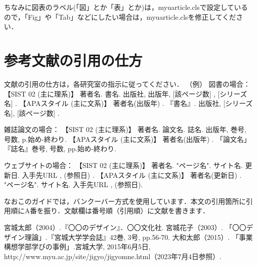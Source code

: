 \documentclass[paper=a4paper,jafontsize=9pt,twocolumn,number_oflines=45,line_length=28zw]{myuarticle}
\begin{document}
ちなみに図表のラベル(「図」とか「表」とか)は，myuarticle.clsで設定しているので，「Fig」や「Tab」などにしたい場合は，myuarticle.clsを修正してください．

\section{参考文献の引用の仕方}
文献の引用の仕方は，各研究室の指示に従ってください．
（例）
図書の場合：
【SIST 02 (主に理系)】
著者名. 書名. 出版社, 出版年,  [該ページ数] ,  [シリーズ名] .
【APAスタイル (主に文系)】
著者名(出版年) . 『書名』. 出版社,  [シリーズ名],  [該ページ数] .

雑誌論文の場合：
【SIST 02 (主に理系)】
著者名. 論文名. 誌名. 出版年, 巻号, 号数,  p.始め-終わり.
【APAスタイル (主に文系)】
著者名(出版年) . 「論文名」『誌名』巻号, 号数,  pp.始め-終わり.

ウェブサイトの場合：
【SIST 02 (主に理系)】
著者名. "ページ名". サイト名. 更新日. 入手先URL ,  (参照日) .
【APAスタイル (主に文系)】
著者名(更新日) . "ページ名". サイト名. 入手先URL ,  (参照日).

なおこのガイドでは，バンクーバー方式を使用しています．本文の引用箇所に引用順にA番を振り．文献欄は番号順（引用順）に文献を書きます．

\vspace{5pt}
\renewcommand{\refname}{\normalsize 4.　　参考文献}
\begin{thebibliography}{9}
 宮城太郎（2004）.『〇〇のデザイン』．〇〇文化社.
 宮城花子（2003）. 「〇〇デザイン理論」.『宮城大学学会誌』42巻, 3号, pp.56-70.
 大和太郎（2015）. 「事業構想学部学びの事例」.宮城大学, 2015年6月5日, http://www.myu.ac.jp/site/jigyo/jigyomne.html（2023年7月4日参照）.
\end{thebibliography}

\end{document}
